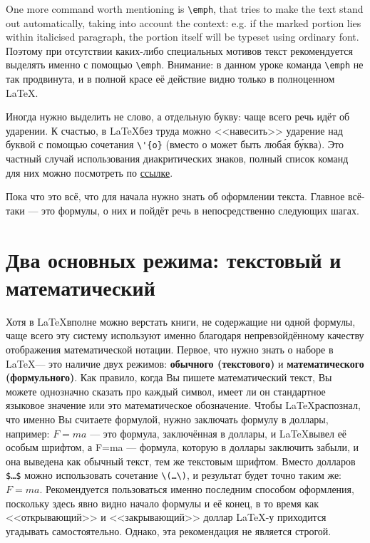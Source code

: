 {\par One more command worth mentioning is \verb"\emph", that tries to make the text stand out automatically, taking into account the context: e.g. if the marked portion lies within italicised paragraph, the portion itself will be typeset using ordinary font. Поэтому при отсутствии каких-либо специальных мотивов текст рекомендуется выделять именно с помощью \verb"\emph". Внимание: в данном уроке команда \verb"\emph" не так продвинута, и в полной красе её действие видно только в полноценном \LaTeX.

\par Иногда нужно выделить не слово, а отдельную букву: чаще всего речь идёт об ударении. К счастью, в \LaTeX без труда можно <<навесить>> ударение над буквой с помощью сочетания \verb"\'{о}" (вместо о может быть люб\'{а}я б\'{у}ква). Это частный случай использования диакритических знаков, полный список команд для них можно посмотреть по \href{https://en.wikibooks.org/wiki/LaTeX/Special_Characters#Escaped_codes}{ссылке}.

\par Пока что это всё, что для начала нужно знать об оформлении текста. Главное всё-таки --- это формулы, о них и пойдёт речь в непосредственно следующих шагах.


\section{Два основных режима: текстовый и математический}
\par Хотя в \LaTeX вполне можно верстать книги, не содержащие ни одной формулы, чаще всего эту систему используют именно благодаря непревзойдённому качеству отображения математической нотации. Первое, что нужно знать о наборе в \LaTeX --- это наличие двух режимов: \textbf{обычного (текстового)} и \textbf{математического (формульного)}. Как правило, когда Вы пишете математический текст, Вы можете однозначно сказать про каждый символ, имеет ли он стандартное языковое значение или это математическое обозначение. Чтобы \LaTeX распознал, что именно Вы считаете формулой, нужно заключать формулу в доллары, например: $F=ma$ --- это формула, заключённая в доллары, и \LaTeX вывел её особым шрифтом, а F=ma --- формула, которую в доллары заключить забыли, и она выведена как обычный текст, тем же текстовым шрифтом. Вместо долларов \verb"$…$" можно использовать сочетание \verb"\(…\)", и результат будет точно таким же: \(F=ma.\) Рекомендуется пользоваться именно последним способом оформления, поскольку здесь явно видно начало формулы и её конец, в то время как <<открывающий>> и <<закрывающий>> доллар \LaTeX-у приходится угадывать самостоятельно. Однако, эта рекомендация не является строгой.


}
